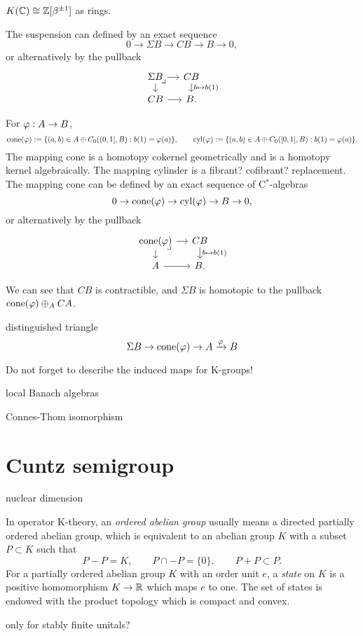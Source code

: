 \documentclass{../../large}
\begin{document}
$K(\mathbb{C})\cong\mathbb{Z}[\beta^{\pm1}]$ as rings.

The suspension can defined by an exact sequence
\[0\to\Sigma B\to CB\to B\to0,\]
or alternatively by the pullback
\[\begin{tikzcd}[sep=small]
\Sigma B\rar\dar\pullback & CB\dar{b\mapsto b(1)} \\
CB \rar & B.
\end{tikzcd}\]

For $\varphi:A\to B$,
\[\operatorname{cone}(\varphi):=\{(a,b)\in A\oplus C_0((0,1],B):b(1)=\varphi(a)\},\qquad\operatorname{cyl}(\varphi):=\{(a,b)\in A\oplus C_0([0,1],B):b(1)=\varphi(a)\}.\]
The mapping cone is a homotopy cokernel geometrically and is a homotopy kernel algebraically.
The mapping cylinder is a fibrant? cofibrant? replacement.
The mapping cone can be defined by an exact sequence of C$^*$-algebras
\[0\to \operatorname{cone}(\varphi)\to \operatorname{cyl}(\varphi)\to B\to0,\]
or alternatively by the pullback
\[\begin{tikzcd}[sep=small]
\cone(\f)\rar\dar\pullback & CB\dar{b\mapsto b(1)} \\
A \rar & B.
\end{tikzcd}\]


We can see that $CB$ is contractible, and $\Sigma B$ is homotopic to the pullback $\operatorname{cone}(\varphi)\oplus_ACA$.

distinguished triangle
\[\Sigma B\to \operatorname{cone}(\varphi)\to A\xrightarrow{\varphi}B\]

Do not forget to describe the induced maps for K-groups!








local Banach algebras



\begin{prb}
\end{prb}
Connes-Thom isomorphism


\section{Cuntz semigroup}

nuclear dimension





\begin{prb}
In operator K-theory, an \emph{ordered abelian group} usually means a directed partially ordered abelian group, which is equivalent to an abelian group $K$ with a subset $P\subset K$ such that
\[P-P=K,\qquad P\cap-P=\{0\},\qquad P+P\subset P.\]
For a partially ordered abelian group $K$ with an order unit $e$, a \emph{state} on $K$ is a positive homomorphism $K\to\mathbb{R}$ which maps $e$ to one.
The set of states is endowed with the product topology which is compact and convex.

only for stably finite unitals?
\end{prb}
\end{document}
